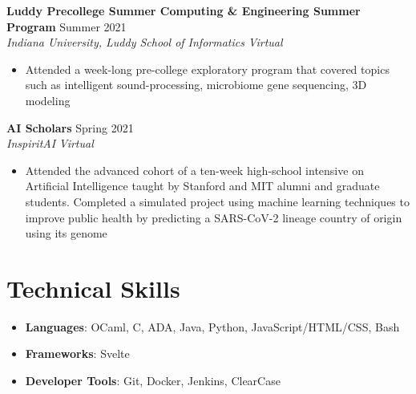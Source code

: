 \documentclass[letterpaper,8pt]{article}
\newcommand{\resumeEntry}[4]{
    \vspace{4pt}
    \large \textbf{#1}
    \normalsize \hfill #2
    \\
    \textit{#3} \hfill \textit{#4}
    \vspace{1pt}
}
\newcommand{\itemsBegin}{
    \begin{itemize}[leftmargin=0.2in, labelsep=0.05in, itemsep=0pt, parsep=1pt, topsep=0pt, partopsep=0pt]
}
\newcommand{\itemsEnd}{\end{itemize}}
\begin{document}
    \resumeEntry
        {Luddy Precollege Summer Computing \& Engineering Summer Program}
        {Summer 2021}
        {Indiana University, Luddy School of Informatics}
        {Virtual}

    \itemsBegin
        \item Attended a week-long pre-college exploratory program that covered topics such as intelligent sound-processing, microbiome gene sequencing, 3D modeling
    \itemsEnd


    \resumeEntry
        {AI Scholars}
        {Spring 2021}
        {InspiritAI}
        {Virtual}

    \itemsBegin
        \item Attended the advanced cohort of a ten-week high-school intensive on Artificial Intelligence taught by Stanford and MIT alumni and graduate students. Completed a simulated project using machine learning techniques to improve public health by predicting a SARS-CoV-2 lineage country of origin using its genome
    \itemsEnd

\section{Technical Skills}

    \itemsBegin
        \item \textbf{Languages}{: OCaml, C, ADA, Java, Python, JavaScript/HTML/CSS, Bash}
        \item \textbf{Frameworks}{: Svelte}
        \item \textbf{Developer Tools}{: Git, Docker, Jenkins, ClearCase}
    \itemsEnd

\end{document}
